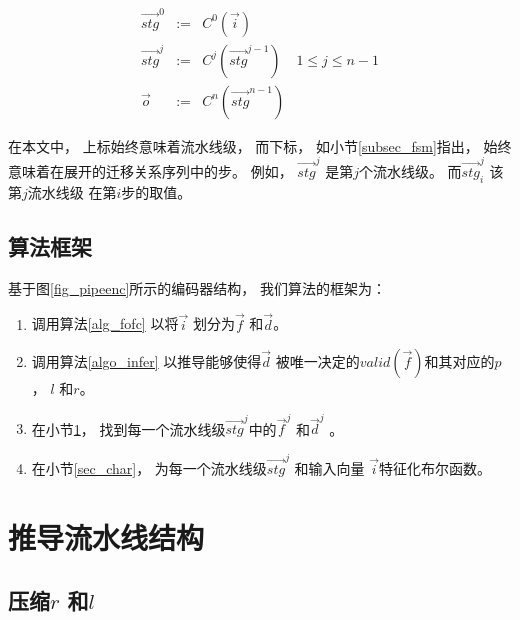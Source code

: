 \begin{equation}\label{equ_genpipe}
\begin{array}{cccc}
\vec{stg}^0   & := & C^0(\vec{i})         &\\
\vec{stg}^j   & := & C^j(\vec{stg}^{j-1}) & 1\le j\le n-1\\
\vec{o}       & := & C^n(\vec{stg}^{n-1}) &
\end{array}
\end{equation}





在本文中，
上标始终意味着流水线级，
而下标，
如小节\ref{subsec_fsm}指出，
始终意味着在展开的迁移关系序列中的步。
例如，
$\vec{stg}^j$ 是第$j$个流水线级。
而$\vec{stg}^j_i$ 该第$j$流水线级
在第$i$步的取值。

\subsection{算法框架}\label{algo_algoframework}

基于图\ref{fig_pipeenc}所示的编码器结构，
我们算法的框架为：

\begin{enumerate}
 \item 调用算法\ref{alg_fofc} 以将$\vec{i}$ 划分为$\vec{f}$ 和$\vec{d}$。
 \item 调用算法\ref{algo_infer} 以推导能够使得$\vec{d}$
 被唯一决定的$valid(\vec{f})$和其对应的$p$， $l$ 和$r$。
 \item 在小节\ref{sec_pipeinfer}，
 找到每一个流水线级$\vec{stg}^j$中的$\vec{f}^j$ 和$\vec{d}^j$ 。
 \item 在小节\ref{sec_char}，
 为每一个流水线级$\vec{stg}^j$
 和输入向量 $\vec{i}$特征化布尔函数。
\end{enumerate}



\section{推导流水线结构}\label{sec_pipeinfer}


\subsection{压缩$r$ 和$l$}\label{reduceing}


